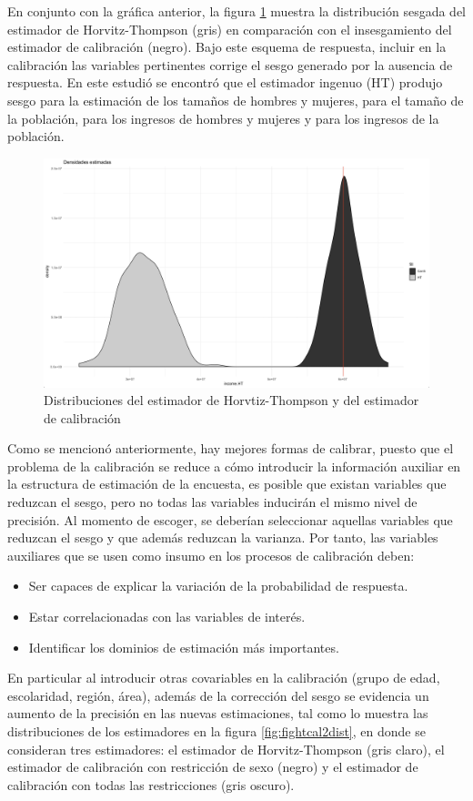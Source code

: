 \documentclass[
  12pt,
  spanish,
]{book}
\providecommand{\tightlist}{%
  \setlength{\itemsep}{0pt}\setlength{\parskip}{0pt}}
\begin{document}
En conjunto con la gráfica anterior, la figura \ref{fig:fightcaldist} muestra la distribución sesgada del estimador de Horvitz-Thompson (gris) en comparación con el insesgamiento del estimador de calibración (negro). Bajo este esquema de respuesta, incluir en la calibración las variables pertinentes corrige el sesgo generado por la ausencia de respuesta. En este estudió se encontró que el estimador ingenuo (HT) produjo sesgo para la estimación de los tamaños de hombres y mujeres, para el tamaño de la población, para los ingresos de hombres y mujeres y para los ingresos de la población.

\begin{figure}

{\centering \includegraphics[width=0.5\linewidth]{Pics/c10} 

}

\caption{Distribuciones del estimador de Horvtiz-Thompson y del estimador de calibración}\label{fig:fightcaldist}
\end{figure}

Como se mencionó anteriormente, hay mejores formas de calibrar, puesto que el problema de la calibración se reduce a cómo introducir la información auxiliar en la estructura de estimación de la encuesta, es posible que existan variables que reduzcan el sesgo, pero no todas las variables inducirán el mismo nivel de precisión. Al momento de escoger, se deberían seleccionar aquellas variables que reduzcan el sesgo y que además reduzcan la varianza. Por tanto, las variables auxiliares que se usen como insumo en los procesos de calibración deben:

\begin{itemize}
\tightlist
\item
  Ser capaces de explicar la variación de la probabilidad de respuesta.
\item
  Estar correlacionadas con las variables de interés.
\item
  Identificar los dominios de estimación más importantes.
\end{itemize}

En particular al introducir otras covariables en la calibración (grupo de edad, escolaridad, región, área), además de la corrección del sesgo se evidencia un aumento de la precisión en las nuevas estimaciones, tal como lo muestra las distribuciones de los estimadores en la figura \ref{fig:fightcal2dist}, en donde se consideran tres estimadores: el estimador de Horvitz-Thompson (gris claro), el estimador de calibración con restricción de sexo (negro) y el estimador de calibración con todas las restricciones (gris oscuro).
\end{document}
